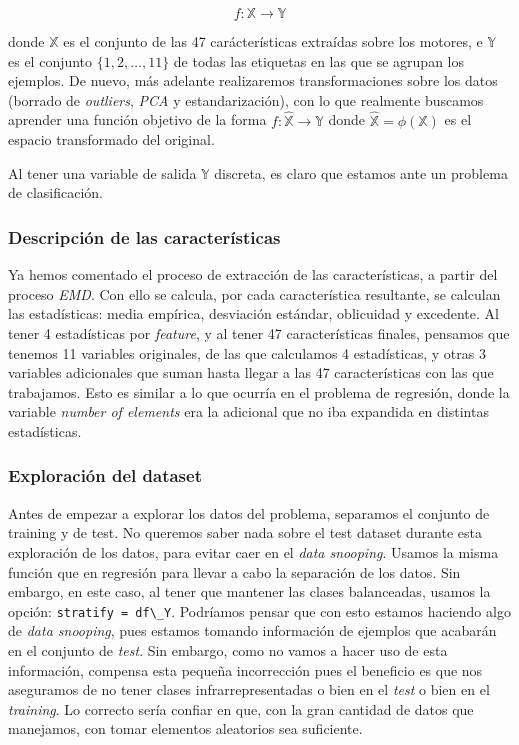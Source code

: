\documentclass[11pt]{article}
\begin{document}
$$f: \mathbb{X} \rightarrow \mathbb{Y}$$

donde $\mathbb{X}$ es el conjunto de las 47 carácterísticas extraídas sobre los motores, e $\mathbb{Y}$ es el conjunto $\{1, 2, \ldots, 11\}$ de todas las etiquetas en las que se agrupan los ejemplos. De nuevo, más adelante realizaremos transformaciones sobre los datos (borrado de \emph{outliers}, \emph{PCA} y estandarización), con lo que realmente buscamos aprender una función objetivo de la forma $f: \hat{\mathbb{X}} \rightarrow \mathbb{Y}$ donde $\hat{\mathbb{X}} = \phi(\mathbb{X})$ es el espacio transformado del original.

Al tener una variable de salida $\mathbb{Y}$ discreta, es claro que estamos ante un problema de clasificación.

\subsubsection{Descripción de las características}

Ya hemos comentado el proceso de extracción de las características, a partir del proceso \emph{EMD}. Con ello se calcula, por cada característica resultante, se calculan las estadísticas: media empírica, desviación estándar, oblicuidad y excedente. Al tener 4 estadísticas por \emph{feature}, y al tener 47 características finales, pensamos que tenemos 11 variables originales, de las que calculamos 4 estadísticas, y otras 3 variables adicionales que suman hasta llegar a las 47 características con las que trabajamos. Esto es similar a lo que ocurría en el problema de regresión, donde la variable \emph{number of elements} era la adicional que no iba expandida en distintas estadísticas.

\subsubsection{Exploración del dataset}

Antes de empezar a explorar los datos del problema, separamos el conjunto de training y de test. No queremos saber nada sobre el test dataset durante esta exploración de los datos, para evitar caer en el \emph{data snooping}. Usamos la misma función que en regresión para llevar a cabo la separación de los datos. Sin embargo, en este caso, al tener que mantener las clases balanceadas, usamos la opción: \lstinline{stratify = df\_Y}. Podríamos pensar que con esto estamos haciendo algo de \emph{data snooping}, pues estamos tomando información de ejemplos que acabarán en el conjunto de \emph{test}. Sin embargo, como no vamos a hacer uso de esta información, compensa esta pequeña incorrección pues el beneficio es que nos aseguramos de no tener clases infrarrepresentadas o bien en el \emph{test} o bien en el \emph{training}. Lo correcto sería confiar en que, con la gran cantidad de datos que manejamos, con tomar elementos aleatorios sea suficiente.
\end{document}
